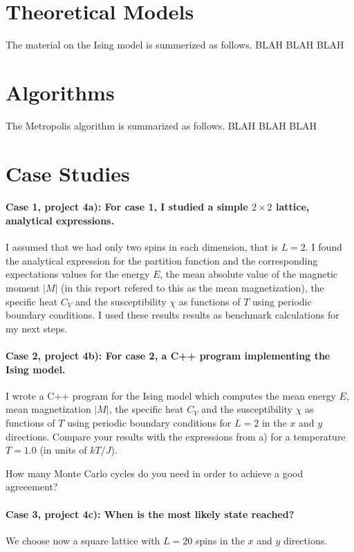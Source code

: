 \documentclass[10pt,showpacs,preprintnumbers,footinbib,amsmath,amssymb,aps,prl,twocolumn,groupedaddress,superscriptaddress,showkeys]{revtex4-1}
\begin{document}
\section{Theoretical Models}
The material on the Ising model is summerized as follows. 
BLAH BLAH BLAH

\section{Algorithms}
The Metropolis algorithm is summarized as follows.
BLAH BLAH BLAH 

\section{Case Studies}

\paragraph{Case 1, project 4a): For case 1, I studied a simple $2\times 2$ lattice, analytical expressions.}
I assumed that we had only two spins in each dimension, that is $L=2$. I found the analytical expression 
for the partition function and the corresponding
expectations values for the energy $E$, the mean absolute value of the magnetic moment $\vert M\vert$ (in this report refered to this as the mean magnetization), 
the specific heat $C_V$ and the susceptibility $\chi$ 
as functions of  $T$ using periodic boundary conditions. I used these results results as benchmark calculations for my next steps.

\paragraph{Case 2, project 4b):  For case 2, a C++ program implementing the Ising model.}
I wrote a C++ program for the Ising model which computes the mean energy 
$E$, mean magnetization 
$\vert M\vert$, the specific heat $C_V$ and the susceptibility $\chi$ 
as functions of  $T$ using periodic boundary conditions for 
$L=2$ in the $x$ and $y$ directions. 
Compare your results with the expressions from a)
for  a  temperature $T=1.0$ (in units of $kT/J$). 

How many Monte Carlo cycles do you need in order to achieve a 
good agreeement?

\paragraph{Case 3, project 4c): When is the most likely state reached?}
We choose now a square lattice with $L=20$ spins in the $x$ and $y$ directions. 
\end{document}

